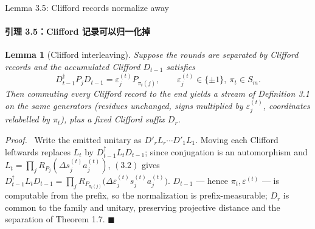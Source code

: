 \documentclass[aspectratio=169,10pt]{beamer}
\newif\ifzh \zhfalse
\newcommand{\bl}[2]{\ifzh #2\else #1\fi}
\newtheorem{lemma2}{Lemma}
\theoremstyle{definition}
\newenvironment{prf}[1][Proof]%
  {\par\smallskip\noindent\textit{#1.}\ \ignorespaces}%
  {\hfill$\blacksquare$\par\smallskip}
\newcommand{\zhsub}[1]{\ifzh\else\framesubtitle{#1}\fi}
\begin{document}
\begin{frame}{\bl{Lemma 3.5: Clifford records normalize away}%
                {引理 3.5：Clifford 记录可以归一化掉}}
  \zhsub{引理 3.5：Clifford 记录可以归一化掉}
  \scriptsize
  \begin{lemma2}[Clifford interleaving]
    Suppose the rounds are separated by Clifford records and the accumulated
    Clifford $D_{t-1}$ satisfies
    \begin{equation}
      D_{t-1}^\dagger P_jD_{t-1}=\varepsilon_j^{(t)}P_{\pi_t(j)},
      \qquad \varepsilon_j^{(t)}\in\{\pm1\},\ \pi_t\in S_m.\tag{3.2}
    \end{equation}
    Then commuting every Clifford record to the end yields a stream of
    Definition 3.1 on the same generators (residues unchanged, signs
    multiplied by $\varepsilon_j^{(t)}$, coordinates relabelled by $\pi_t$),
    plus a fixed Clifford suffix $D_r$.
  \end{lemma2}
  \begin{prf}
    Write the emitted unitary as $D'_rL_r\cdots D'_1L_1$. Moving each Clifford
    leftwards replaces $L_t$ by $D_{t-1}^\dagger L_tD_{t-1}$; since
    conjugation is an automorphism and
    $L_t=\prod_jR_{P_j}(\Delta s_j^{(t)}a_j^{(t)})$, $(3.2)$ gives
    $D_{t-1}^\dagger L_tD_{t-1}
     =\prod_jR_{P_{\pi_t(j)}}\big(\Delta\varepsilon_j^{(t)}s_j^{(t)}
      a_j^{(t)}\big)$.
    $D_{t-1}$ --- hence $\pi_t,\varepsilon^{(t)}$ --- is computable from the
    prefix, so the normalization is \alert{prefix-measurable}; $D_r$ is common
    to the family and unitary, preserving projective distance and the
    separation of Theorem 1.7.
  \end{prf}
\end{frame}
\end{document}
